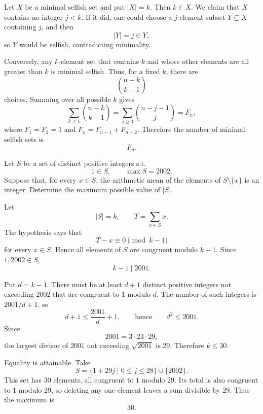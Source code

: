     \begin{solution}
        Let $X$ be a minimal selfish set and put $|X|=k$. Then $k\in X$. We
        claim that $X$ contains no integer $j<k$. If it did, one could choose a
        $j$-element subset $Y\subsetneq X$ containing $j$, and then
        \[
            |Y|=j\in Y,
        \]
        so $Y$ would be selfish, contradicting minimality.

        Conversely, any $k$-element set that contains $k$ and whose other
        elements are all greater than $k$ is minimal selfish. Thus, for a fixed
        $k$, there are
        \[
            \binom{n-k}{k-1}
        \]
        choices. Summing over all possible $k$ gives
        \[
            \sum_{k\geq1}\binom{n-k}{k-1}
            =
            \sum_{j\geq0}\binom{n-j-1}{j}
            =
            F_n,
        \]
        where $F_1=F_2=1$ and $F_n=F_{n-1}+F_{n-2}$. Therefore the number of
        minimal selfish sets is
        \[
            \boxed{F_n}.
        \]
    \end{solution}

    \begin{expectedproblem}[2002 AIME I]
        Let $S$ be a set of distinct positive integers s.t.
        \[
            1\in S,
            \qquad
            \max S=2002.
        \]
        Suppose that, for every $x\in S$, the arithmetic mean of the elements
        of $S\setminus\{x\}$ is an integer. Determine the maximum possible
        value of $|S|$.
    \end{expectedproblem}

    \begin{solution}
        Let
        \[
            |S|=k,
            \qquad
            T=\sum_{x\in S}x.
        \]
        The hypothesis says that
        \[
            T-x\equiv0\pmod{k-1}
        \]
        for every $x\in S$. Hence all elements of $S$ are congruent modulo
        $k-1$. Since $1,2002\in S$,
        \[
            k-1\mid2001.
        \]

        Put $d=k-1$. There must be at least $d+1$ distinct positive integers not
        exceeding $2002$ that are congruent to $1$ modulo $d$. The number of
        such integers is $2001/d+1$, so
        \[
            d+1\leq\frac{2001}{d}+1,
            \qquad\text{hence}\qquad
            d^2\leq2001.
        \]
        Since
        \[
            2001=3\cdot23\cdot29,
        \]
        the largest divisor of $2001$ not exceeding $\sqrt{2001}$ is $29$.
        Therefore $k\leq30$.

        Equality is attainable. Take
        \[
            S
            =
            \{1+29j\mid0\leq j\leq28\}\cup\{2002\}.
        \]
        This set has $30$ elements, all congruent to $1$ modulo $29$. Its total
        is also congruent to $1$ modulo $29$, so deleting any one element leaves
        a sum divisible by $29$. Thus the maximum is
        \[
            \boxed{30}.
        \]
    \end{solution}


